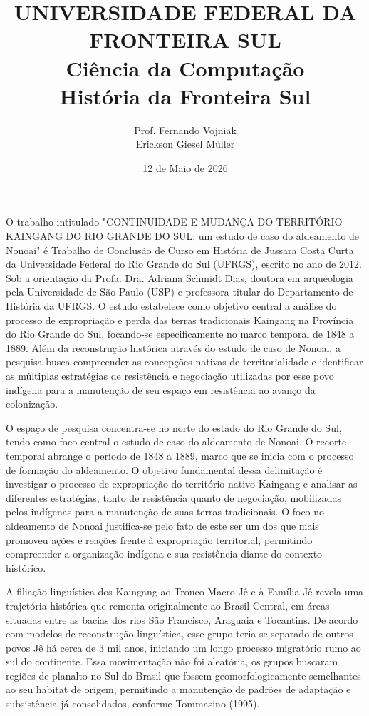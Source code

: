 \documentclass[12pt, a4paper]{article}
\title{UNIVERSIDADE FEDERAL DA FRONTEIRA SUL\\Ciência da Computação\\História da Fronteira Sul}
\author{Prof. Fernando Vojniak\\Erickson Giesel Müller}
\date{12 de Maio de 2026}
\begin{document}
\maketitle
\thispagestyle{empty} %

O trabalho intitulado "CONTINUIDADE E MUDANÇA DO TERRITÓRIO KAINGANG DO RIO GRANDE DO SUL: um estudo de caso do aldeamento de Nonoai" é Trabalho de Conclusão de Curso em História de Jussara Costa Curta da Universidade Federal do Rio Grande do Sul (UFRGS), escrito no ano de 2012. Sob a orientação da Profa. Dra. Adriana Schmidt Dias, doutora em arqueologia pela Universidade de São Paulo (USP) e professora titular do Departamento de História da UFRGS. O estudo estabelece como objetivo central a análise do processo de expropriação e perda das terras tradicionais Kaingang na Província do Rio Grande do Sul, focando-se especificamente no marco temporal de 1848 a 1889. Além da reconstrução histórica através do estudo de caso de Nonoai, a pesquisa busca compreender as concepções nativas de territorialidade e identificar as múltiplas estratégias de resistência e negociação utilizadas por esse povo indígena para a manutenção de seu espaço em resistência ao avanço da colonização.

O espaço de pesquisa concentra-se no norte do estado do Rio Grande do Sul, tendo como foco central o estudo de caso do aldeamento de Nonoai. O recorte temporal abrange o período de 1848 a 1889, marco que se inicia com o processo de formação do aldeamento. O objetivo fundamental dessa delimitação é investigar o processo de expropriação do território nativo Kaingang e analisar as diferentes estratégias, tanto de resistência quanto de negociação, mobilizadas pelos indígenas para a manutenção de suas terras tradicionais. O foco no aldeamento de Nonoai justifica-se pelo fato de este ser um dos que mais promoveu ações e reações frente à expropriação territorial, permitindo compreender a organização indígena e sua resistência diante do contexto histórico.

A filiação linguística dos Kaingang ao Tronco Macro-Jê e à Família Jê revela uma trajetória histórica que remonta originalmente ao Brasil Central, em áreas situadas entre as bacias dos rios São Francisco, Araguaia e Tocantins. De acordo com modelos de reconstrução linguística, esse grupo teria se separado de outros povos Jê há cerca de 3 mil anos, iniciando um longo processo migratório rumo ao sul do continente. Essa movimentação não foi aleatória, os grupos buscaram regiões de planalto no Sul do Brasil que fossem geomorfologicamente semelhantes ao seu habitat de origem, permitindo a manutenção de padrões de adaptação e subsistência já consolidados, conforme Tommasino (1995).
\end{document}
